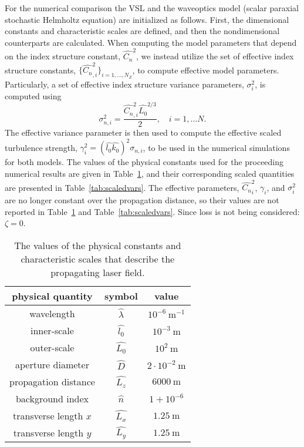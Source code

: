 \documentclass[9pt,twocolumn,twoside]{osajnl}
\begin{document}
For the numerical comparison the VSL and the waveoptics model (scalar paraxial stochastic Helmholtz equation) 
are initialized as follows. First, the dimensional constants and characteristic scales are defined, and 
then the nondimensional counterparts are calculated. When computing the model parameters that depend on the index 
structure constant, $\widehat{C_n}^2$, we instead utilize the set of effective index structure constants, 
$\{\widehat{C_{n}}_{,i}^2\}_{i=1,\dots,N_{Z}}$, to compute effective model parameters. Particularly, a set of 
effective index structure variance parameters, $\sigma_{i}^2$, is computed using
\begin{equation}
    \sigma_{n,i}^2 = \frac{\widehat{C_{n}}_{,i}^2 \widehat{L_0}^{2/3}}{2}, \quad i = 1, \dots N.
\end{equation}
The effective variance parameter is then used to compute the effective scaled turbulence strength, $\gamma^2_{i} = (\widehat{l_0}\widehat{k_0})^2\sigma_{n,i}$, to be used in the numerical simulations for both models. 
The values of the physical constants used for the proceeding numerical results are given in Table~\ref{tab:physicalconstants}, and their corresponding scaled quantities are presented in Table~\ref{tab:scaledvars}. 
The effective parameters, $\widehat{C_{n}}_{i}^2$, $\gamma_{i}$, and $\sigma_{i}^2$ are no longer constant over the propagation distance, so their values are not reported in Table~\ref{tab:physicalconstants} and Table~\ref{tab:scaledvars}.
Since loss is not being considered: $\zeta = 0$.
\vspace*{-9mm}
\begin{table}[h!]
	\centering %
	\caption{The values of the physical constants and characteristic scales that describe the propagating laser field.}\label{tab:physicalconstants}
	\begin{tabular}{ccc}
		\hline
		physical quantity 		& symbol 								& value \\
		\hline  
		wavelength 			& $\widehat{\lambda}$ 					& $10^{-6} \ \text{m}^{-1}$ \\
		inner-scale			& $\widehat{l_{0}}$ 					& $10^{-3} \ \text{m}$ \\
		outer-scale 			& $\widehat{L_{0}}$ 					& $10^{2} \ \text{m}$ \\
		aperture diameter 		& $\widehat{D}$ 						& $2\cdot 10^{-2} \ \text{m}$ \\
		propagation distance 	& $\widehat{L_{z}}$ 					& $6000 \ \text{m}$ \\
		background index 		& $\hat{n}$ 							& $1 + 10^{-6}$ \\
		transverse length $x$ 	& $\widehat{L_{x}}$						& $1.25 \ \text{m}$ \\
		transverse length $y$ 	& $\widehat{L_{y}}$ 					& $1.25 \ \text{m}$ \\
		\hline
	\end{tabular}
\end{table}
\end{document}
